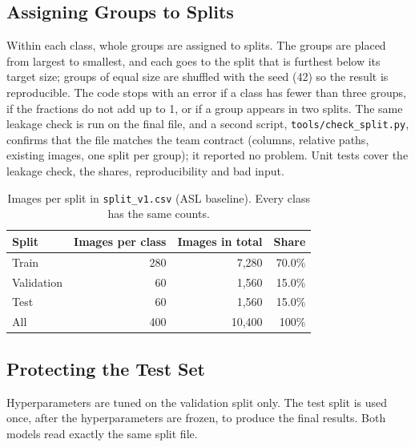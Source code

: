 \subsection{Assigning Groups to Splits}

Within each class, whole groups are assigned to splits. The groups are placed from largest to smallest, and each goes to the split that is furthest below its target size; groups of equal size are shuffled with the seed (42) so the result is reproducible. The code stops with an error if a class has fewer than three groups, if the fractions do not add up to 1, or if a group appears in two splits. The same leakage check is run on the final file, and a second script, \texttt{tools/check\_split.py}, confirms that the file matches the team contract (columns, relative paths, existing images, one split per group); it reported no problem. Unit tests cover the leakage check, the shares, reproducibility and bad input.

\begin{table}[htbp]
  \centering
  \caption{Images per split in \texttt{split\_v1.csv} (ASL baseline). Every class has the same counts.}
  \label{tab:split-counts}
  \begin{tabular}{lrrr}
    \toprule
    Split & Images per class & Images in total & Share \\
    \midrule
    Train & 280 & 7{,}280 & 70.0\% \\
    Validation & 60 & 1{,}560 & 15.0\% \\
    Test & 60 & 1{,}560 & 15.0\% \\
    \midrule
    All & 400 & 10{,}400 & 100\% \\
    \bottomrule
  \end{tabular}
\end{table}

\subsection{Protecting the Test Set}

Hyperparameters are tuned on the validation split only. The test split is used once, after the hyperparameters are frozen, to produce the final results. Both models read exactly the same split file.

